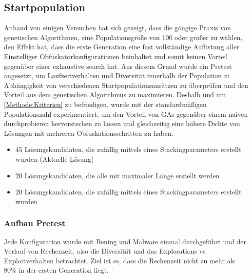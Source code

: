 \subsection{Startpopulation} \label{GA:inital_population}
Anhand von einigen Versuchen hat sich gezeigt, dass die gängige Praxis von genetischen Algorithmen, eine Populationsgröße von 100 oder größer zu wählen, den Effekt hat, dass die erste Generation eine fast vollständige Auflistung aller Einstelliger Obfuskatorkonfigurationen beinhaltet und somit keinen Vorteil gegenüber einer exhaustive search hat. Aus diesem Grund wurde ein Pretest angesetzt, um Laufzeitverhalten und Diversität innerhalb der Population in Abhängigkeit von verschiedenen Startpopulationsansätzen zu überprüfen und den Vorteil aus dem genetischen Algorithmus zu maximieren.
Deshalb und um \ref{Methode:Kriterien} zu befriedigen, wurde mit der standardmäßigen Populationszahl experimentiert, um den Vorteil von GAs gegenüber einem naiven durchprobieren hervorstechen zu lassen und gleichzeitig eine höhere Dichte von Lösungen mit mehreren Obfuskationsschritten zu haben.
\begin{itemize}
    \item 45 Lösungskandidaten, die zufällig mittels eines Stackingparameters erstellt wurden (Aktuelle Lösung)
    \item 20 Lösungskandidaten, die alle mit maximaler Länge erstellt werden
    \item 20 Lösungskandidaten, die zufällig mittels eines Stackingparameters erstellt wurden
\end{itemize}
\subsubsection{Aufbau Pretest}
Jede Konfiguration wurde mit Bening und Malware einmal durchgeführt und der Verlauf von Rechenzeit, also die Diversität und das Explorations vs Exploitverhalten betrachtet. Ziel ist es, dass die Rechenzeit nicht zu mehr als 80\% in der ersten Generation liegt.
